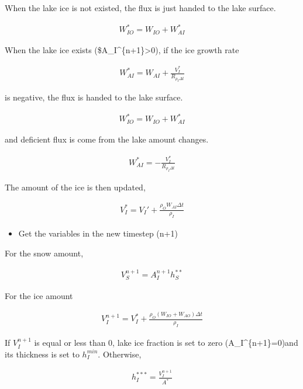 When the lake ice is not existed, the flux is just handed to the lake
surface.

\begin{eqnarray}
    W_{IO}^* = W_{IO} + W_{AI}^*
\end{eqnarray}

When the lake ice exists (\$A\_I\^{}\{n+1\}\textgreater0), if the ice
growth rate

\begin{eqnarray}
    W_{AI}^* = W_{AI} + \frac{V_I^{*}}{R_{\rho_I \Delta t}}
\end{eqnarray}

is negative, the flux is handed to the lake surface.

\begin{eqnarray}
        W_{IO}^* = W_{IO} + W_{AI}^*
\end{eqnarray}

and deficient flux is come from the lake amount changes.

\begin{eqnarray}
    W_{AI}^* = - \frac{V_I^{*}}{R_{\rho_I \Delta t}}
\end{eqnarray}

The amount of the ice is then updated,

\begin{eqnarray}
    V_I^* = V_I' + \frac{\rho_O W_{AI}\Delta t}{\rho_I}
\end{eqnarray}

\begin{itemize}
\tightlist
\item
  Get the variables in the new timestep (n+1)
\end{itemize}

For the snow amount,

\begin{eqnarray}
    V_S^{n+1} = A_I^{n+1} h_S^{**}
\end{eqnarray}

For the ice amount

\begin{eqnarray}
    V_I^{n+1} = V_I^* + \frac{\rho_O (W_{IO}+W_{AO})\Delta t}{\rho_I}
\end{eqnarray}

If \(V_I^{n+1}\) is equal or less than 0, lake ice fraction is set to
zero (A\_I\^{}\{n+1\}=0)and its thickness is set to \(h_I^{min}\).
Otherwise,

\begin{eqnarray}
    h_I^{***} = \frac{V_I^{n+1}}{A^*}
\end{eqnarray}

